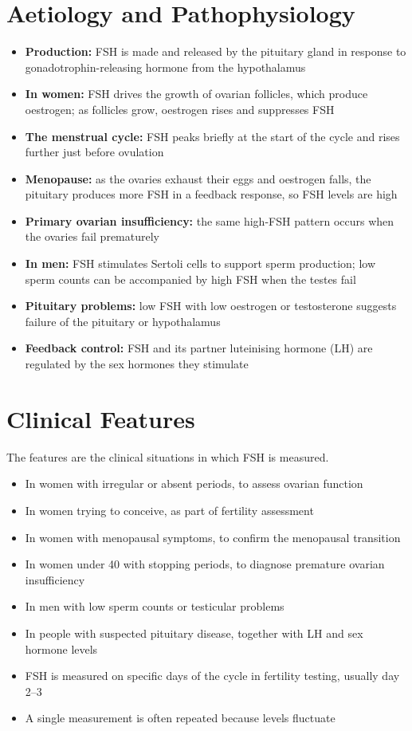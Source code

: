\section*{Aetiology and Pathophysiology}
\begin{itemize}
    \item \textbf{Production:} FSH is made and released by the pituitary gland in response to gonadotrophin-releasing hormone from the hypothalamus
    \item \textbf{In women:} FSH drives the growth of ovarian follicles, which produce oestrogen; as follicles grow, oestrogen rises and suppresses FSH
    \item \textbf{The menstrual cycle:} FSH peaks briefly at the start of the cycle and rises further just before ovulation
    \item \textbf{Menopause:} as the ovaries exhaust their eggs and oestrogen falls, the pituitary produces more FSH in a feedback response, so FSH levels are high
    \item \textbf{Primary ovarian insufficiency:} the same high-FSH pattern occurs when the ovaries fail prematurely
    \item \textbf{In men:} FSH stimulates Sertoli cells to support sperm production; low sperm counts can be accompanied by high FSH when the testes fail
    \item \textbf{Pituitary problems:} low FSH with low oestrogen or testosterone suggests failure of the pituitary or hypothalamus
    \item \textbf{Feedback control:} FSH and its partner luteinising hormone (LH) are regulated by the sex hormones they stimulate
\end{itemize}

\section*{Clinical Features}
The features are the clinical situations in which FSH is measured.
\begin{itemize}
    \item In women with irregular or absent periods, to assess ovarian function
    \item In women trying to conceive, as part of fertility assessment
    \item In women with menopausal symptoms, to confirm the menopausal transition
    \item In women under 40 with stopping periods, to diagnose premature ovarian insufficiency
    \item In men with low sperm counts or testicular problems
    \item In people with suspected pituitary disease, together with LH and sex hormone levels
    \item FSH is measured on specific days of the cycle in fertility testing, usually day 2--3
    \item A single measurement is often repeated because levels fluctuate
\end{itemize}

